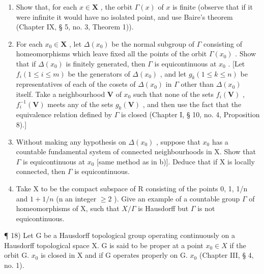 \begin{enumerate}
\def\labelenumi{\alph{enumi})}
\item
  Show that, for each \(x \in \mathbf{X}\) , the orbit \(\Gamma(x)\) of \(x\) is finite (observe that if it were infinite it would have no isolated point, and use Baire's theorem (Chapter IX, § 5, no. 3, Theorem 1)).
\item
  For each \(x_0 \in \mathbf{X}\) , let \(\Delta(x_0)\) be the normal subgroup of \(\Gamma\) consisting of homeomorphisms which leave fixed all the points of the orbit \(\Gamma(x_0)\) . Show that if \(\Delta(x_0)\) is finitely generated, then \(\Gamma\) is equicontinuous at \(x_0\) . {[}Let \(f_i (1 \leqslant i \leqslant m)\) be the generators of \(\Delta(x_0)\) , and let \(g_k (1 \leqslant k \leqslant n)\) be representatives of each of the cosets of \(\Delta(x_0)\) in \(\Gamma\) other than \(\Delta(x_0)\) itself. Take a neighbourhood \(\mathbf{V}\) of \(x_0\) such that none of the sets \(f_i(\mathbf{V})\) , \(f_i^{-1}(\mathbf{V})\) meets any of the sets \(g_k(\mathbf{V})\) , and then use the fact that the equivalence relation defined by \(\Gamma\) is closed (Chapter I, § 10, no. 4, Proposition 8).{]}
\item
  Without making any hypothesis on \(\Delta(x_{0})\) , suppose that \(x_{0}\) has a countable fundamental system of connected neighbourhoods in X. Show that \(\Gamma\) is equicontinuous at \(x_{0}\) {[}same method as in b){]}. Deduce that if X is locally connected, then \(\Gamma\) is equicontinuous.
\item
  Take X to be the compact subspace of R consisting of the points 0, 1, 1/n and \(1 + 1/n\) (n an integer \(\geqslant 2\) ). Give an example of a countable group \(\Gamma\) of homeomorphisms of X, such that \(X/\Gamma\) is Hausdorff but \(\Gamma\) is not equicontinuous.
\end{enumerate}

¶ 18) Let G be a Hausdorff topological group operating continuously on a Hausdorff topological space X. G is said to be proper at a point \(x_{0} \in X\) if the orbit G. \(x_{0}\) is closed in X and if G operates properly on G. \(x_{0}\) (Chapter III, § 4, no. 1).

